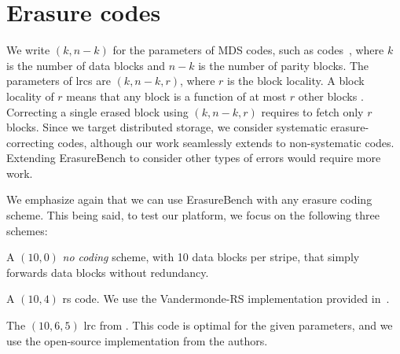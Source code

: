 \section{Erasure codes}

\label{sec:codes}

We write $(k,n-k)$ for the parameters of MDS codes, such as  codes~\autocite{reed-solomon}, where $k$ is the number of data blocks and $n-k$ is the number of parity blocks. The parameters of \acp{lrc} are  $(k,n-k,r)$, where $r$ is the block locality. A block locality of $r$ means that any block is a function of at most $r$ other blocks \autocite{XorbasVLDB}. Correcting a single erased block using $(k,n-k,r)$ requires to fetch only $r$ blocks. Since we target distributed storage, we consider systematic erasure-correcting codes, although our work seamlessly extends to non-systematic codes. Extending ErasureBench to consider other types of errors would require more work.

We emphasize again that we can use ErasureBench with any erasure coding scheme. This being said, to test our platform, we focus on the following three schemes:
\begin{description}
\item[\textbf{NC}] A $(10,0)$ \emph{no coding} scheme, with 10 data blocks per stripe, that simply forwards data blocks without redundancy.
\item[\textbf{\acs{rs}}] A $(10,4)$ \acf{rs} code. We use the Vandermonde-RS implementation provided in~\autocite{XorbasVLDB}.  
\item[\textbf{\acs{lrc}}] The $(10,6,5)$ \acs{lrc} from \autocite{XorbasVLDB}. This code is optimal for the given parameters, and we use the open-source implementation from the authors.
\end{description}
